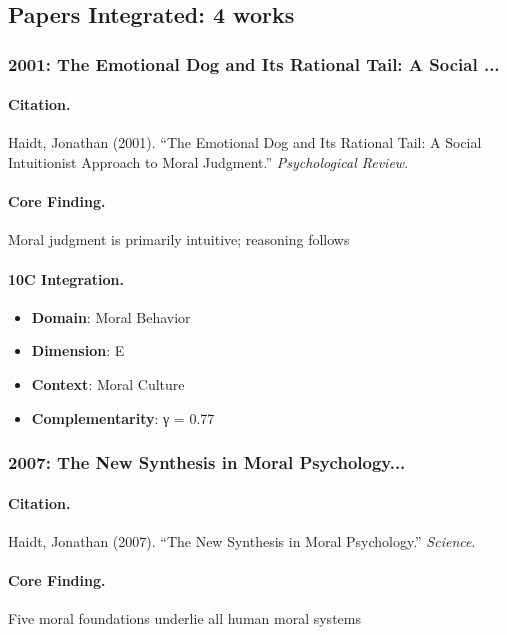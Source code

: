 \subsection{Papers Integrated: 4 works}

\subsubsection{2001: The Emotional Dog and Its Rational Tail: A Social ...}

\paragraph{Citation.}
Haidt, Jonathan (2001). ``The Emotional Dog and Its Rational Tail: A Social Intuitionist Approach to Moral Judgment.''
\textit{Psychological Review}.

\paragraph{Core Finding.}
Moral judgment is primarily intuitive; reasoning follows

\paragraph{10C Integration.}
\begin{itemize}[nosep]
  \item \textbf{Domain}: Moral Behavior
  \item \textbf{Dimension}: E
  \item \textbf{Context}: Moral Culture
  \item \textbf{Complementarity}: γ = 0.77
\end{itemize}

\subsubsection{2007: The New Synthesis in Moral Psychology...}

\paragraph{Citation.}
Haidt, Jonathan (2007). ``The New Synthesis in Moral Psychology.''
\textit{Science}.

\paragraph{Core Finding.}
Five moral foundations underlie all human moral systems

